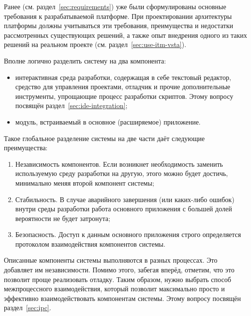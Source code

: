 Ранее (см. раздел~\ref{sec:requirements}) уже были сформулированы основные требования к разрабатываемой платформе. При проектировании архитектуры платформы должны учитываться эти требования, преимущества и недостатки рассмотренных существующих решений, а также опыт внедрения одного из таких решений на реальном проекте (см. раздел~\ref{sec:use-itm-vsta}).

Вполне логично разделить систему на два компонента:
\begin{itemize}
 \item интерактивная среда разработки, содержащая в себе текстовый редактор, средство для управления проектами, отладчик и прочие дополнительные инструменты, упрощающие процесс разработки скриптов. Этому вопросу посвящён раздел~\ref{sec:ide-integration};
 \item модуль, встраиваемый в основное (расширяемое) приложение.
\end{itemize}

Такое глобальное разделение системы на две части даёт следующие преимущества:
\begin{enumerate}
 \item Независимость компонентов. Если возникнет необходимость заменить используемую среду разработки на другую, этого можно будет достичь, минимально меняя второй компонент системы;
 \item Стабильность. В случае аварийного завершения (или каких-либо ошибок) внутри среды разработки работа основного приложения с большей долей вероятности не будет затронута;
 \item Безопасность. Доступ к данным основного приложения строго определяется протоколом взаимодействия компонентов системы.
\end{enumerate}

Описанные компоненты системы выполняются в разных процессах. Это добавляет им независимости. Помимо этого, забегая вперёд, отметим, что это позволит проще реализовать отладку. Таким образом, нужно выбрать способ межпроцессного взаимодействия, который позволит максимально просто и эффективно взаимодействовать компонентам системы. Этому вопросу посвящён раздел~\ref{sec:ipc}.
